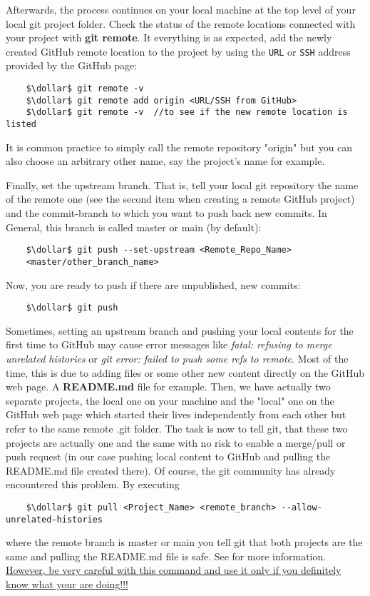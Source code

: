 Afterwards, the process continues on your local machine at the top level of your local git project folder. Check the status of the remote locations connected with 
your project with \textbf{git remote}. It everything is as expected, add the newly created GitHub remote location to the project by using the \verb|URL| or \verb|SSH|
address provided by the GitHub page:

\begin{lstlisting}
	$\dollar$ git remote -v
	$\dollar$ git remote add origin <URL/SSH from GitHub>
	$\dollar$ git remote -v  //to see if the new remote location is listed
\end{lstlisting}
It is common practice to simply call the remote repository "origin" but you can also choose an arbitrary other name, say the project's name for example.

Finally, set the upstream branch. That is, tell your local git repository the name of the remote one (see the second item when creating a remote GitHub project) and the 
commit-branch to which you want to push back new commits. In General, this branch is called master or main (by default):

\begin{lstlisting}
	$\dollar$ git push --set-upstream <Remote_Repo_Name> 
	<master/other_branch_name>
\end{lstlisting}
Now, you are ready to push if there are unpublished, new commits:
\begin{lstlisting}
	$\dollar$ git push
\end{lstlisting}
Sometimes, setting an upstream branch and pushing your local contents for the first time to GitHub may cause error messages like \textit{fatal: refusing to merge
unrelated histories} or \textit{git error: failed to push some refs to remote}. Most of the time, this is due to adding files or some other new content directly 
on the GitHub web page. A \textbf{README.md} file for example. Then, we have actually two separate projects, the local one on your machine and the "local" one on the 
GitHub web page which started their lives independently from each other but refer to the same remote .git folder. The task is now to tell git, that these two projects
are actually one and the same with no risk to enable a merge/pull or push request (in our case pushing local content to GitHub and pulling the README.md file created there).  
Of course, the git community has already encountered this problem. By executing   
\begin{lstlisting}
	$\dollar$ git pull <Project_Name> <remote_branch> --allow-unrelated-histories
\end{lstlisting}
where the remote branch is master or main you tell git that both projects are the same and pulling the README.md file is safe. See \cite{Git2021git-merge} for more
information.
\\
\ul{However, be very careful with this command and use it only if you definitely know what your are doing!!!}







